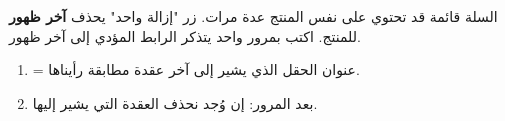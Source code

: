 \begin{statement}
السلة قائمة قد تحتوي على نفس المنتج عدة مرات. زر "إزالة واحد" يحذف \textbf{آخر ظهور} للمنتج. اكتب  بمرور واحد يتذكر الرابط المؤدي إلى آخر ظهور.
\end{statement}
\begin{stepsbox}\begin{enumerate}
\item {} = عنوان الحقل الذي يشير إلى آخر عقدة مطابقة رأيناها.
\item بعد المرور: إن وُجد  نحذف العقدة التي يشير إليها.
\end{enumerate}\end{stepsbox}

